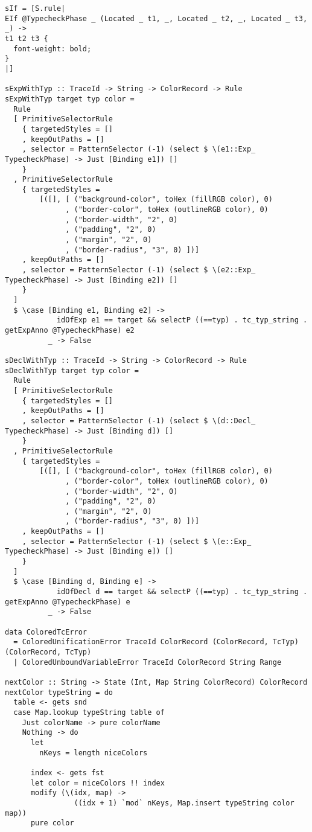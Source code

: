 \documentclass[acmsmall, screen]{acmart}
\begin{document}
{\begin{verbatim}
sIf = [S.rule|
EIf @TypecheckPhase _ (Located _ t1, _, Located _ t2, _, Located _ t3, _) ->
t1 t2 t3 {
  font-weight: bold;
}
|]

sExpWithTyp :: TraceId -> String -> ColorRecord -> Rule
sExpWithTyp target typ color =
  Rule
  [ PrimitiveSelectorRule
    { targetedStyles = []
    , keepOutPaths = []
    , selector = PatternSelector (-1) (select $ \(e1::Exp_ TypecheckPhase) -> Just [Binding e1]) []
    }
  , PrimitiveSelectorRule
    { targetedStyles =
        [([], [ ("background-color", toHex (fillRGB color), 0)
              , ("border-color", toHex (outlineRGB color), 0)
              , ("border-width", "2", 0)
              , ("padding", "2", 0)
              , ("margin", "2", 0)
              , ("border-radius", "3", 0) ])]
    , keepOutPaths = []
    , selector = PatternSelector (-1) (select $ \(e2::Exp_ TypecheckPhase) -> Just [Binding e2]) []
    }
  ]
  $ \case [Binding e1, Binding e2] ->
            idOfExp e1 == target && selectP ((==typ) . tc_typ_string . getExpAnno @TypecheckPhase) e2
          _ -> False

sDeclWithTyp :: TraceId -> String -> ColorRecord -> Rule
sDeclWithTyp target typ color =
  Rule
  [ PrimitiveSelectorRule
    { targetedStyles = []
    , keepOutPaths = []
    , selector = PatternSelector (-1) (select $ \(d::Decl_ TypecheckPhase) -> Just [Binding d]) []
    }
  , PrimitiveSelectorRule
    { targetedStyles =
        [([], [ ("background-color", toHex (fillRGB color), 0)
              , ("border-color", toHex (outlineRGB color), 0)
              , ("border-width", "2", 0)
              , ("padding", "2", 0)
              , ("margin", "2", 0)
              , ("border-radius", "3", 0) ])]
    , keepOutPaths = []
    , selector = PatternSelector (-1) (select $ \(e::Exp_ TypecheckPhase) -> Just [Binding e]) []
    }
  ]
  $ \case [Binding d, Binding e] ->
            idOfDecl d == target && selectP ((==typ) . tc_typ_string . getExpAnno @TypecheckPhase) e
          _ -> False

data ColoredTcError
  = ColoredUnificationError TraceId ColorRecord (ColorRecord, TcTyp) (ColorRecord, TcTyp)
  | ColoredUnboundVariableError TraceId ColorRecord String Range

nextColor :: String -> State (Int, Map String ColorRecord) ColorRecord
nextColor typeString = do
  table <- gets snd
  case Map.lookup typeString table of
    Just colorName -> pure colorName
    Nothing -> do
      let
        nKeys = length niceColors

      index <- gets fst
      let color = niceColors !! index
      modify (\(idx, map) ->
                ((idx + 1) `mod` nKeys, Map.insert typeString color map))
      pure color


\end{verbatim}}
\end{document}
